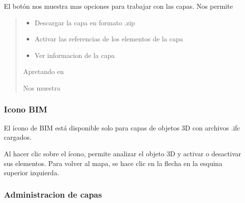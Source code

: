 \documentclass[a4paper,11pt,spanish]{sphinxmanual}
\begin{document}
\sphinxAtStartPar
El botón \sphinxstylestrong{+} nos muestra mas opciones para trabajar con las capas. Nos permite
\begin{quote}
\begin{itemize}
\item {} 
\sphinxAtStartPar
Descargar la capa en formato .zip

\end{itemize}

\noindent{}
\begin{itemize}
\item {} 
\sphinxAtStartPar
Activar las referencias de los elementos de la capa

\end{itemize}

\noindent{}
\begin{itemize}
\item {} 
\sphinxAtStartPar
Ver informacion de la capa

\end{itemize}

\sphinxAtStartPar
Apretando en

\noindent{}

\sphinxAtStartPar
Nos muestra

\noindent{}
\end{quote}


\subsubsection{Icono BIM}
\label{\detokenize{navigation/cards:icono-bim}}
\sphinxAtStartPar
El ícono de BIM está disponible solo para capas de objetos 3D con archivos .ifc cargados.

\noindent{}

\sphinxAtStartPar
Al hacer clic sobre el ícono, permite analizar el objeto 3D y activar o desactivar sus elementos. Para volver al mapa, se hace clic en la flecha en la esquina superior izquierda.

\noindent{}


\subsubsection{Administracion de capas}
\label{\detokenize{navigation/cards:administracion-de-capas}}
\end{document}
